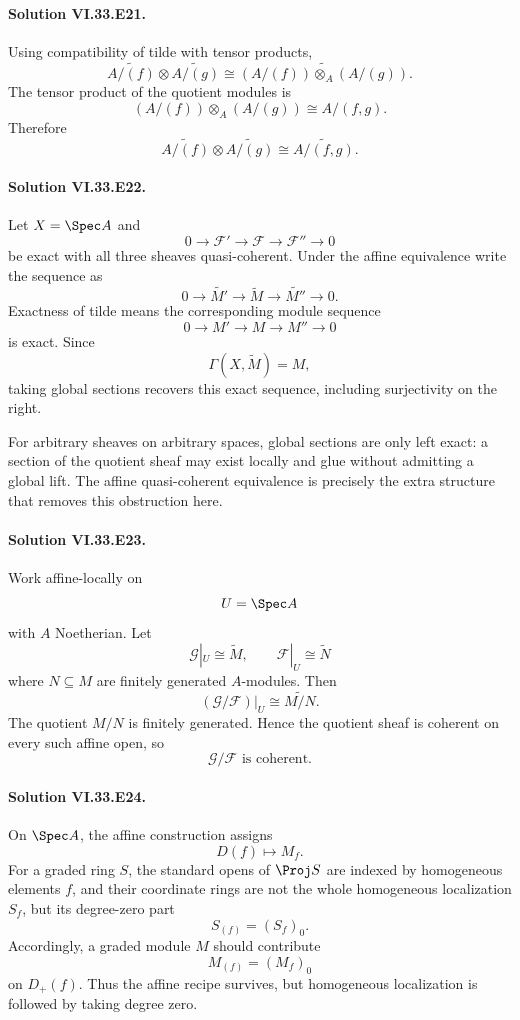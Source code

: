 \paragraph{Solution VI.33.E21.}
Using compatibility of tilde with tensor products,
\[
\widetilde{A/(f)}\otimes\widetilde{A/(g)}
\cong
\widetilde{(A/(f))\otimes_A(A/(g))}.
\]
The tensor product of the quotient modules is
\[
(A/(f))\otimes_A(A/(g))
\cong
A/(f,g).
\]
Therefore
\[
\boxed{
\widetilde{A/(f)}\otimes\widetilde{A/(g)}
\cong
\widetilde{A/(f,g)}.
}
\]

\paragraph{Solution VI.33.E22.}
Let \(X=\Spec A\) and
\[
0\to\mathcal F'\to\mathcal F\to\mathcal F''\to0
\]
be exact with all three sheaves quasi-coherent. Under the affine equivalence write the sequence as
\[
0\to\widetilde{M'}\to\widetilde M\to\widetilde{M''}\to0.
\]
Exactness of tilde means the corresponding module sequence
\[
0\to M'\to M\to M''\to0
\]
is exact. Since
\[
\Gamma(X,\widetilde M)=M,
\]
taking global sections recovers this exact sequence, including surjectivity on the right.

For arbitrary sheaves on arbitrary spaces, global sections are only left exact: a section of the quotient sheaf
may exist locally and glue without admitting a global lift.  The affine quasi-coherent equivalence is precisely the
extra structure that removes this obstruction here.

\paragraph{Solution VI.33.E23.}
Work affine-locally on
\[
U=\Spec A
\]
with \(A\) Noetherian.  Let
\[
\mathcal G|_U\cong\widetilde M,
\qquad
\mathcal F|_U\cong\widetilde N
\]
where \(N\subseteq M\) are finitely generated \(A\)-modules. Then
\[
(\mathcal G/\mathcal F)|_U
\cong
\widetilde{M/N}.
\]
The quotient \(M/N\) is finitely generated. Hence the quotient sheaf is coherent on every such affine open, so
\[
\boxed{\mathcal G/\mathcal F\text{ is coherent}.}
\]

\paragraph{Solution VI.33.E24.}
On \(\Spec A\), the affine construction assigns
\[
D(f)\longmapsto M_f.
\]
For a graded ring \(S\), the standard opens of \(\Proj S\) are indexed by homogeneous elements \(f\), and their
coordinate rings are not the whole homogeneous localization \(S_f\), but its degree-zero part
\[
S_{(f)}=(S_f)_0.
\]
Accordingly, a graded module \(M\) should contribute
\[
M_{(f)}=(M_f)_0
\]
on \(D_+(f)\).  Thus the affine recipe survives, but homogeneous localization is followed by taking degree zero.

